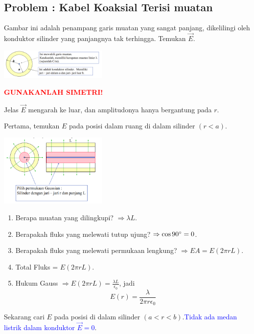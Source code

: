 \documentclass[twocolumn, 11pt]{article}%
\begin{document}
    \subsection{Problem : Kabel Koaksial Terisi muatan}%
    Gambar ini adalah penampang garis muatan yang sangat panjang, dikelilingi oleh konduktor silinder yang panjangnya tak terhingga.  Temukan $\vec E$.

    \begin{center}
        \includegraphics[width=200px]{22.png}
    \end{center}

    \textcolor{red}{\textbf{GUNAKANLAH SIMETRI!}}

    Jelas $\vec E$ mengarah ke luar, dan amplitudonya hanya bergantung pada $r$.

    Pertama, temukan $E$ pada posisi dalam ruang di dalam silinder $(r<a)$.
    \begin{center}
        \includegraphics[width=200px]{23.png}
    \end{center}

    \begin{enumerate}
        \item Berapa muatan yang dilingkupi? $\Rightarrow \lambda L$.
        \item Berapakah fluks yang melewati tutup ujung? $\Rightarrow \cos 90\degree=0$.
        \item Berapakah fluks yang melewati permukaan lengkung? $\Rightarrow EA = E(2\pi rL)$.
        \item Total Fluks = $E(2\pi rL)$.
        \item Hukum Gauss $\Rightarrow E(2\pi rL)=\frac{\lambda L}{\epsilon_0}$, jadi
            \[ E(r)=\frac{\lambda}{2\pi r\epsilon_0} \]
    \end{enumerate}

    Sekarang cari $E$ pada posisi di dalam silinder $(a<r<b)$.\textcolor{blue}{Tidak ada medan listrik dalam konduktor $\vec E=0$}.
\end{document}
